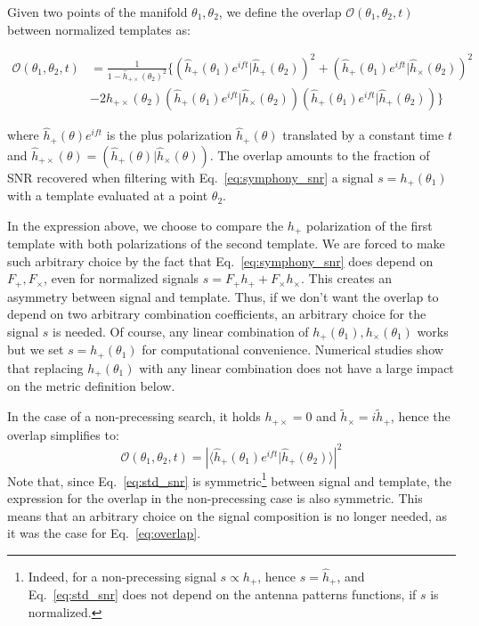 \documentclass[twocolumn,showpacs,preprintnumbers,nofootinbib,prd,
superscriptaddress,10pt]{revtex4-2}
\newcommand{\scalar}[2]{\langle #1|#2 \rangle}
\newcommand{\rescalar}[2]{( #1 |#2 )}
\newcommand{\rescalarwide}[2]{\left( #1 \lvert #2 \right)}
\begin{document}
Given two points of the manifold $\theta_1,\theta_2$, we define the overlap $\mathcal{O}(\theta_1,\theta_2, t)$ between normalized templates as:
\begin{widetext}
	\begin{align}\label{eq:overlap}
		\mathcal{O}(\theta_1,\theta_2, t) &= \frac{1}{1- \hat{h}_{+\times}(\theta_2)^2} 
		\biggl\{ \rescalarwide{\hat{h}_+(\theta_1)e^{i ft}}{\hat{h}_+(\theta_2)}^2 + \rescalarwide{\hat{h}_+(\theta_1)e^{i ft}}{\hat{h}_\times(\theta_2)}^2 \nonumber \\
		& -2h_{+\times}(\theta_2)\rescalarwide{\hat{h}_+(\theta_1)e^{i ft}}{\hat{h}_\times(\theta_2)}\rescalarwide{\hat{h}_+(\theta_1)e^{i ft}}{\hat{h}_+(\theta_2)} \biggl\}
	\end{align}
\end{widetext}
where $\hat{h}_+(\theta)e^{i ft}$ is the plus polarization $\hat{h}_+(\theta)$ translated by a constant time $t$ and $\hat{h}_{+\times}(\theta) = \rescalar{\hat{h}_+(\theta)}{\hat{h}_\times(\theta)}$.
The overlap amounts to the fraction of SNR recovered when filtering with Eq.~\eqref{eq:symphony_snr} a signal $s=h_+(\theta_1)$ with a template evaluated at a point $\theta_2$.

In the expression above, we choose to compare the $h_+$ polarization of the first template with both polarizations of the second template. We are forced to make such arbitrary choice by the fact that Eq.~\eqref{eq:symphony_snr} does depend on $F_+, F_\times$, even for normalized signals $s = F_+h_+ + F_\times h_\times$.
This creates an asymmetry between signal and template.
Thus, if we don't want the overlap to depend on two arbitrary combination coefficients, an arbitrary choice for the signal $s$ is needed.
Of course, any linear combination of $h_+(\theta_1), h_\times(\theta_1)$ works but we set $s = h_+(\theta_1)$ for computational convenience. Numerical studies show that replacing $h_+(\theta_1)$ with any linear combination does not have a large impact on the metric definition below.

In the case of a non-precessing search, it holds $h_{+\times} = 0$ and $\tilde{h}_\times = i \tilde{h}_+$, hence the overlap simplifies to:
\begin{equation}\label{eq:overlap_NP}
\mathcal{O}(\theta_1,\theta_2, t) = \left|\scalar{\hat{h}_+(\theta_1)e^{i ft}}{\hat{h}_+(\theta_2)} \right|^2
\end{equation}
Note that, since Eq.~\eqref{eq:std_snr} is symmetric\footnote{Indeed, for a non-precessing signal $s \propto h_+$, hence $\hat{s} = \hat{h}_+$, and Eq.~\eqref{eq:std_snr} does not depend on the antenna patterns functions, if $s$ is normalized.} between signal and template, the expression for the overlap in the non-precessing case is also symmetric. This means that an arbitrary choice on the signal composition is no longer needed, as it was the case for Eq.~\eqref{eq:overlap}.
\end{document}

